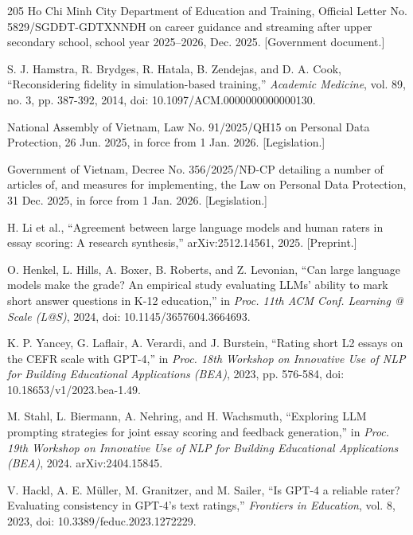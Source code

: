 \begin{thebibliography}{205}
 Ho Chi Minh City Department of Education and Training, Official Letter No. 5829/\allowbreak{}SGDĐT-\allowbreak{}GDTXNNĐH on career guidance and streaming after upper secondary school, school year 2025--2026, Dec. 2025. [Government document.]

 S. J. Hamstra, R. Brydges, R. Hatala, B. Zendejas, and D. A. Cook, ``Reconsidering fidelity in simulation-\allowbreak{}based training,'' \textit{Academic Medicine}, vol. 89, no. 3, pp. 387-392, 2014, doi: 10.\allowbreak{}1097/\allowbreak{}ACM.\allowbreak{}0000000000000130.

 National Assembly of Vietnam, Law No. 91/\allowbreak{}2025/\allowbreak{}QH15 on Personal Data Protection, 26 Jun. 2025, in force from 1 Jan. 2026. [Legislation.\allowbreak{}]

 Government of Vietnam, Decree No. 356/\allowbreak{}2025/\allowbreak{}NĐ-\allowbreak{}CP detailing a number of articles of, and measures for implementing, the Law on Personal Data Protection, 31 Dec. 2025, in force from 1 Jan. 2026. [Legislation.\allowbreak{}]

 H. Li et al., ``Agreement between large language models and human raters in essay scoring: A research synthesis,'' arXiv:2512.\allowbreak{}14561, 2025. [Preprint.]

 O. Henkel, L. Hills, A. Boxer, B. Roberts, and Z. Levonian, ``Can large language models make the grade? An empirical study evaluating LLMs' ability to mark short answer questions in K-12 education,'' in \textit{Proc. 11th ACM Conf. Learning @ Scale (L@S)}, 2024, doi: 10.\allowbreak{}1145/\allowbreak{}3657604.\allowbreak{}3664693.

 K. P. Yancey, G. Laflair, A. Verardi, and J. Burstein, ``Rating short L2 essays on the CEFR scale with GPT-4,'' in \textit{Proc. 18th Workshop on Innovative Use of NLP for Building Educational Applications (BEA)}, 2023, pp. 576-584, doi: 10.\allowbreak{}18653/\allowbreak{}v1/\allowbreak{}2023.\allowbreak{}bea-\allowbreak{}1.\allowbreak{}49.

 M. Stahl, L. Biermann, A. Nehring, and H. Wachsmuth, ``Exploring LLM prompting strategies for joint essay scoring and feedback generation,'' in \textit{Proc. 19th Workshop on Innovative Use of NLP for Building Educational Applications (BEA)}, 2024. arXiv:2404.\allowbreak{}15845.

 V. Hackl, A. E. M\"uller, M. Granitzer, and M. Sailer, ``Is GPT-4 a reliable rater? Evaluating consistency in GPT-4's text ratings,'' \textit{Frontiers in Education}, vol. 8, 2023, doi: 10.\allowbreak{}3389/\allowbreak{}feduc.\allowbreak{}2023.\allowbreak{}1272229.


\end{thebibliography}
